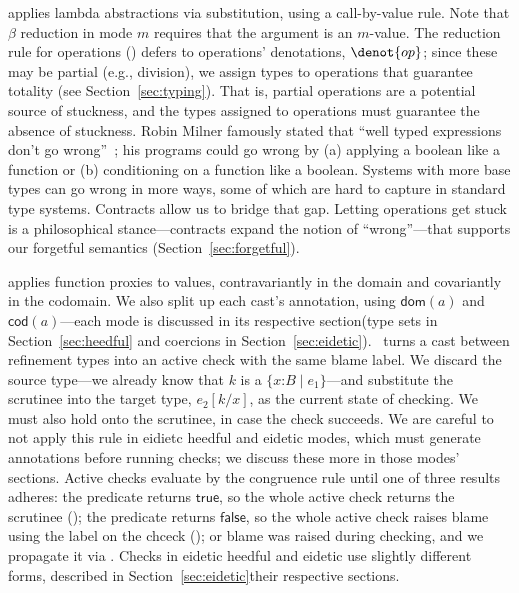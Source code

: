 \documentclass[9pt]{extarticle}
\newcommand{\ottnt}[1]{\mathit{#1}}
\begin{document}
 applies lambda abstractions via substitution, using a
call-by-value rule. Note that $\beta$ reduction in mode $\ottnt{m}$
requires that the argument is an $\ottnt{m}$-value.
The reduction rule for operations () defers to operations'
denotations, $ \denot{ op } $; since these may be partial (e.g.,
division), we assign types to operations that guarantee totality (see
Section~\ref{sec:typing}).
That is, partial operations are a potential source of stuckness, and
the types assigned to operations must guarantee the absence of
stuckness.
Robin Milner famously stated that ``well typed expressions don't go
wrong''~\cite{Milner78atheory}; his programs could go wrong by (a)
applying a boolean like a function or (b) conditioning on a function
like a boolean. Systems with more base types can go wrong in more
ways, some of which are hard to capture in standard type
systems. Contracts allow us to bridge that gap.
Letting operations get stuck is a philosophical stance---contracts
expand the notion of ``wrong''\iffull---that supports our forgetful semantics
(Section~\ref{sec:forgetful})\fi. 


 applies function proxies to values, contravariantly in the
domain and covariantly in the codomain. We also split up each cast's
annotation, using $ \mathsf{dom} ( \ottnt{a} ) $ and $ \mathsf{cod} ( \ottnt{a} ) $\ifpopl---each mode is
discussed in its respective section\iffull (type sets in
Section~\ref{sec:heedful} and coercions in
Section~\ref{sec:eidetic})\fi\fi.
\ECheckNone\ turns a cast between refinement types into
an active check with the same blame label. We discard the source
type---we already know that $\ottnt{k}$ is a $ \{ \mathit{x} \mathord{:} \ottnt{B} \mathrel{\mid} \ottnt{e_{{\mathrm{1}}}} \} $---and
substitute the scrutinee into the target type, $ \ottnt{e_{{\mathrm{2}}}}  [  \ottnt{k} / \mathit{x}  ] $, as the
current state of checking. We must also hold onto the scrutinee, in
case the check succeeds.
We are careful to not apply this rule in \ifpopl eidietc \lambdah\else
heedful and eidetic modes\fi, which must generate annotations before
running checks\iffull; we discuss these more in those modes'
sections\fi.
Active checks evaluate by the congruence rule  until one
of three results adheres: the predicate returns $ \mathsf{true} $, so the
whole active check returns the scrutinee (); the predicate
returns $ \mathsf{false} $, so the whole active check raises blame using the
label on the chceck (); or blame was raised during
checking, and we propagate it via .  
\ifpopl Checks in eidetic \lambdah \else heedful and eidetic \fi use
slightly different forms, described in \ifpopl
Section~\ref{sec:eidetic}\else their respective sections\fi.
\end{document}
